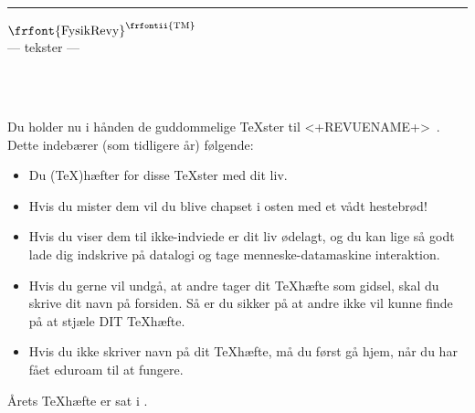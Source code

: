 \documentclass[11pt]{article}
\begin{document}
\thispagestyle{empty}

\begin{flushright}
	{\tiny <+TOPQUOTE+>}
\end{flushright}
\hrule
\begin{center}
{\frfont $\textrm{\frfont{FysikRevy}}^{\textrm{\frfontii{{TM}}}}$}
\\ --- {\frfontii tekster} ---
\vspace{2cm}

{}\\ %
\vspace{5mm}
{\cmfnttt{\today}}\\
\vspace{1cm}
%
\end{center}


\begin{center}

\Large
Du holder nu i hånden de guddommelige \TeX ster til <+REVUENAME+>\ <+REVUEYEAR+>. Dette indebærer (som tidligere år) følgende:
\begin{itemize}
\item Du (\TeX)hæfter for disse \TeX ster med dit liv.
\item Hvis du mister dem vil du blive chapset i osten med et vådt hestebrød!
\item Hvis du viser dem til ikke-indviede er dit liv ødelagt, og du kan lige så 
godt lade dig indskrive på datalogi og tage menneske-datamaskine interaktion.
\item Hvis du gerne vil undgå, at andre tager dit \TeX hæfte som gidsel,
skal du skrive dit navn på forsiden. Så er du sikker på at andre ikke vil kunne
finde på at stjæle DIT \TeX hæfte. 
\item Hvis du ikke skriver navn på dit \TeX hæfte, må du først gå hjem, når du har fået eduroam til at fungere.
\end{itemize}
\end{center}
\vfill



\vfill
Årets \TeX hæfte er sat i \LaTeXe.
\begin{center}
	{\tiny <+BOTTOMQUOTE+>}
\end{center}
\end{document}
